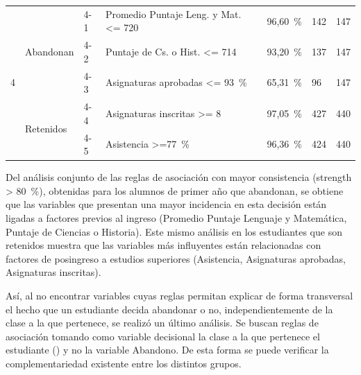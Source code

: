 \documentclass[portuguese]{textolivre}
\begin{document}
\begin{table}[htbp]
\begin{tabular}{lllp{5cm}lll}
    \cmidrule{1-7}
    \multirow{5}{*}{4} &
    \multirow{3}{*}{Abandonan} & 4-1 & Promedio Puntaje Leng. y Mat. <= 720 & 96,60~\% & 142 & 147\\
    & & 4-2 & Puntaje de Cs. o Hist. <= 714 & 93,20~\% & 137 & 147\\
    & & 4-3 & Asignaturas aprobadas <= 93~\% & 65,31~\% & 96 & 147\\
    \cmidrule{2-7}
    & \multirow{2}{*}{Retenidos} & 4-4 & Asignaturas inscritas >= 8 & 97,05~\% & 427 & 440\\
    & & 4-5 & Asistencia >=77~\% & 96,36~\% & 424 & 440\\
    \bottomrule
    \end{tabular}
\end{table}

Del análisis conjunto de las reglas de asociación con mayor consistencia (strength > 80~\%), obtenidas para los alumnos de primer año que abandonan, se obtiene que las variables que presentan una mayor incidencia en esta decisión están ligadas a factores previos al ingreso (Promedio Puntaje Lenguaje y Matemática, Puntaje de Ciencias o Historia). Este mismo análisis en los estudiantes que son retenidos muestra que las variables más influyentes están relacionadas con factores de posingreso a estudios superiores (Asistencia, Asignaturas aprobadas, Asignaturas inscritas).

Así, al no encontrar variables cuyas reglas permitan explicar de forma transversal el hecho que un estudiante decida abandonar o no, independientemente de la clase a la que pertenece, se realizó un último análisis. Se buscan reglas de asociación tomando como variable decisional la clase a la que pertenece el estudiante () y no la variable Abandono. De esta forma se puede verificar la complementariedad existente entre los distintos grupos.
\end{document}
